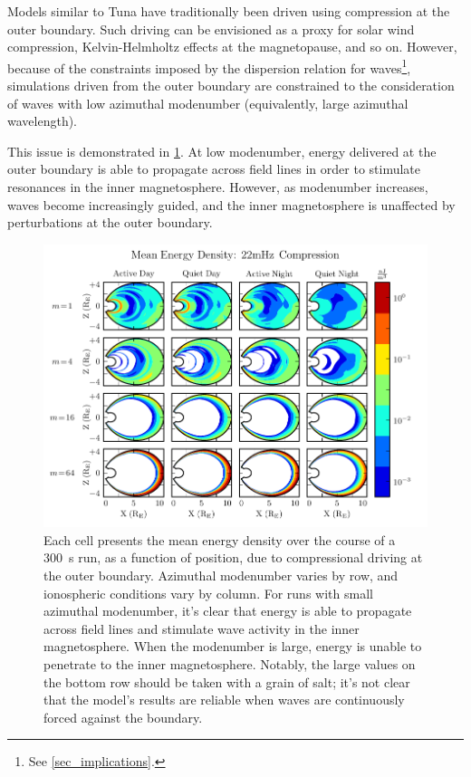 Models similar to Tuna have traditionally been driven using compression at the outer boundary\cite{lysak_2004,lysak_2013,waters_2008,waters_2013}. Such driving can be envisioned as a proxy for solar wind compression, Kelvin-Helmholtz effects at the magnetopause, and so on. However, because of the constraints imposed by the dispersion relation for \Alfven waves\footnote{See \cref{sec_implications}. }, simulations driven from the outer boundary are constrained to the consideration of waves with low azimuthal modenumber (equivalently, large azimuthal wavelength). 

This issue is demonstrated in \cref{fig_bdrive}. At low modenumber, energy delivered at the outer boundary is able to propagate across field lines in order to stimulate resonances in the inner magnetosphere. However, as modenumber increases, \Alfven waves become increasingly guided, and the inner magnetosphere is unaffected by perturbations at the outer boundary. 

\begin{figure}[!htb]
    \centering
    \includegraphics[width=\textwidth]{figures/bdrive.pdf}
    \caption[Decreasing Penetration with Increasing Modenumber]{
      Each cell presents the mean energy density over the course of a \SI{300}{\s} run, as a function of position, due to compressional driving at the outer boundary. Azimuthal modenumber varies by row, and ionospheric conditions vary by column. For runs with small azimuthal modenumber, it's clear that energy is able to propagate across field lines and stimulate wave activity in the inner magnetosphere. When the modenumber is large, energy is unable to penetrate to the inner magnetosphere. Notably, the large values on the bottom row should be taken with a grain of salt; it's not clear that the model's results are reliable when waves are continuously forced against the boundary. 
    }
    \label{fig_bdrive}
\end{figure}

